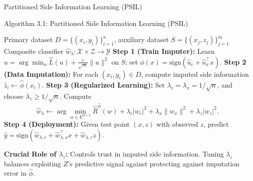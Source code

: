 \documentclass[aspectratio=169, 11pt, t, xcolor=table]{beamer}
\newcommand{\R}{\mathbb{R}}
\newcommand{\cg}[1]{\mathcal{#1}}
\newcommand{\whl}{\hat{w}_\lambda}
\newcommand{\whlc}{\hat{w}_{\lambda,c}}
\newcommand{\whlx}{\hat{w}_{\lambda,x}}
\newcommand{\whlz}{\hat{w}_{\lambda,z}}
\newcommand{\ph}{\hat{\phi}}
\newcommand{\uh}{\hat{u}}
\newcommand{\lamz}{\lambda_z}
\begin{document}
\begin{frame}{Partitioned Side Information Learning (PSIL)}
\begin{block}{Algorithm 3.1: Partitioned Side Information Learning (PSIL)}
\begin{algorithmic}[1]
\footnotesize
\Require Primary dataset $D = \{(x_i, y_i)\}_{i=1}^n$, auxiliary dataset $S = \{(x_j, z_j)\}_{j=1}^m$
\Ensure Composite classifier $\whl: \cg{X} \times \cg{Z} \to \cg{Y}$
\State \textbf{Step 1 (Train Imputer):} Learn $\uh = \arg\min_{u} \hat{L}(u) + \frac{c}{\sqrt{m}}\|u\|^2$ on $S$; set $\ph(x) = \text{sign}(\hat{u}_c + \hat{u}_x^\top x)$.
\State \textbf{Step 2 (Data Imputation):} For each $(x_i, y_i) \in D$, compute imputed side information $\hat{z}_i \gets \ph(x_i)$.
\State \textbf{Step 3 (Regularized Learning):} Set $\lambda_c = \lambda_x = 1/\sqrt{n}$, and choose $\lamz \ge 1/\sqrt{n}$. Compute
\[
  \whl \gets \arg\min_{w \in \R^{d+2}} \hat{R}^{\ph}(w) + \lambda_c |w_c|^2 + \lambda_x \|w_x\|^2 + \lamz |w_z|^2.
\]
\State \textbf{Step 4 (Deployment):} Given test point $(x, z)$ with observed $z$, predict $\hat{y} = \text{sign}(\whlc + \whlx^\top x + \whlz z)$.
\end{algorithmic}
\end{block}

\vspace{0.15em}
\par{\footnotesize \textbf{Crucial Role of $\lamz$:} Controls trust in imputed side information. Tuning $\lamz$ balances exploiting $Z$'s predictive signal against protecting against imputation error in $\ph$.}
\end{frame}
\end{document}
